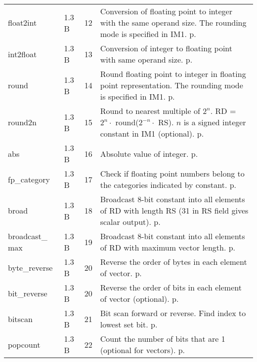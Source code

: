 \documentclass[forwardcom.tex]{subfiles}
\begin{document}
\begin{longtable} {|p{25mm}|p{14mm}|p{10mm}|p{95mm}|}
float2int     & 1.3 B & 12 & Conversion of floating point to integer with the same operand size. The rounding mode is specified in IM1. p. \pageref{table:float2intInstruction} \\
int2float     & 1.3 B & 13 & Conversion of integer to floating point with same operand size. p. \pageref{table:int2floatInstruction} \\

round         & 1.3 B & 14 & Round floating point to integer in floating point  representation. The rounding mode is specified in IM1. p. \pageref{table:roundInstruction} \\
round2n       & 1.3 B & 15 & Round to nearest multiple of $2^n$. \newline 
RD = $2^n\cdot$ round($2^{-n}\cdot$ RS). $n$ is a signed integer constant in IM1 (optional). p. \pageref{table:round2nInstruction} \\
abs           & 1.3 B & 16 & Absolute value of integer. p. \pageref{table:absInstruction} \\

fp\_category  & 1.3 B & 17 & Check if floating point numbers belong to the categories indicated by constant. p. \pageref{table:fpCategoryInstruction} \\

broad         & 1.3 B & 18 & Broadcast 8-bit constant into all elements of RD with length RS (31 in RS field gives scalar output). p. \pageref{table:broadInstruction} \\
broadcast\_ max & 1.3 B & 19 & Broadcast 8-bit constant into all elements of RD with maximum vector length. p. \pageref{table:broadcastMaxInstruction} \\

byte\_reverse & 1.3 B & 20 & Reverse the order of bytes in each element of vector. p. \pageref{table:byteReverseInstruction} \\
bit\_reverse  & 1.3 B & 20 & Reverse the order of bits in each element of vector (optional). p. \pageref{table:bitReverseInstruction} \\

bitscan       & 1.3 B & 21 & Bit scan forward or reverse. Find index to lowest set bit. p. \pageref{table:bitscanInstruction} \\

popcount      & 1.3 B & 22 & Count the number of bits that are 1 (optional for vectors). p. \pageref{table:popcountInstruction} \\


\end{longtable}
\end{document}
